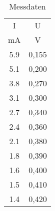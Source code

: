 

\begin{table}
  \centering
  \caption{Messdaten}
  \label{tab:some_data}
  \begin{tabular}{c c }
    \toprule
     I &	 U	   \\
     mA &   V  \\
    \midrule
   5.9  & 0,155	\\
   5.1  & 0,200	\\
   3.8  & 0,270	\\
   3.1  & 0,300 \\
   2.7  & 0,340 \\
   2.4  & 0,360	\\
   2.1  & 0,380	\\
   1.8  & 0,390	\\
   1.6  & 0,400 \\
   1.5  & 0,410	\\
   1.4  & 0,420	\\


    \bottomrule
  \end{tabular}
\end{table}
